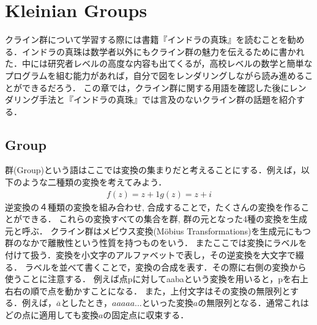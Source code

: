 
\section{Kleinian Groups}
クライン群について学習する際には書籍『インドラの真珠』\cite{indra}を読むことを勧める．インドラの真珠は数学者以外にもクライン群の魅力を伝えるために書かれた．中には研究者レベルの高度な内容も出てくるが，高校レベルの数学と簡単なプログラムを組む能力があれば，自分で図をレンダリングしながら読み進めることができるだろう．
この章では，クライン群に関する用語を確認した後にレンダリング手法と『インドラの真珠』では言及のないクライン群の話題を紹介する．

\subsection{Group}
群(Group)という語はここでは変換の集まりだと考えることにする．例えば，以下のような二種類の変換を考えてみよう．
\begin{eqnarray*}
 f(z) = z + 1 
 g(z) = z + i
\end{eqnarray*}
逆変換の４種類の変換を組み合わせ, 合成することで，たくさんの変換を作ることができる．
これらの変換すべての集合を群, 群の元となった4種の変換を生成元と呼ぶ．
クライン群はメビウス変換(M\"obius Transformations)を生成元にもつ群のなかで離散性という性質を持つものをいう．
またここでは変換にラベルを付けて扱う．変換を小文字のアルファベットで表し，その逆変換を大文字で綴る．
ラベルを並べて書くことで，変換の合成を表す．その際に右側の変換から使うことに注意する．
例えば点pに対してaabaという変換を用いると，pを右上右右の順で点を動かすことになる．
また，上付文字はその変換の無限列とする．例えば，$\overline{a}$としたとき，$aaaaa...$といった変換$a$の無限列となる．通常これはどの点に適用しても変換$a$の固定点に収束する．


